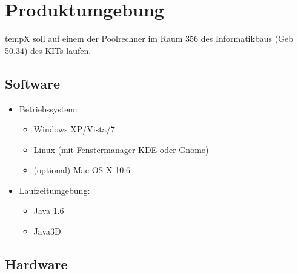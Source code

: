 \section{Produktumgebung}

\label{sec:produktumgebung}

\gls{tempX} soll auf einem der Poolrechner im Raum 356 des Informatikbaus (Geb 50.34) des KITs laufen.

\subsection{Software}

\label{subsec:software}

	\begin{itemize}
		
		\item Betriebssystem: 

			\begin{itemize}

				\item Windows XP/Vista/7

				\item Linux (mit Fenstermanager KDE oder Gnome)

				\item (optional) Mac OS X 10.6

			\end{itemize}
	
		\item Laufzeitumgebung:
		
			\begin{itemize}
				
				\item Java 1.6
				
				\item Java3D
				
			\end{itemize}
		
	\end{itemize}
	
\subsection{Hardware}

